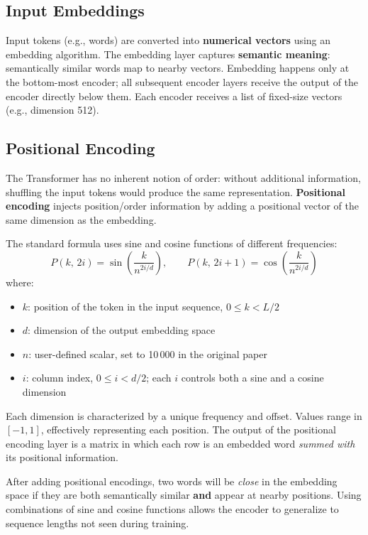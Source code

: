 \documentclass[11pt,a4paper]{article}
\theoremstyle{definition}
\theoremstyle{plain}
\theoremstyle{remark}
\begin{document}
\subsection{Input Embeddings}

Input tokens (e.g., words) are converted into \textbf{numerical vectors} using an embedding algorithm. The embedding layer captures \textbf{semantic meaning}: semantically similar words map to nearby vectors. Embedding happens only at the bottom-most encoder; all subsequent encoder layers receive the output of the encoder directly below them. Each encoder receives a list of fixed-size vectors (e.g., dimension 512).

\subsection{Positional Encoding}

The Transformer has no inherent notion of order: without additional information, shuffling the input tokens would produce the same representation. \textbf{Positional encoding} injects position/order information by adding a positional vector of the same dimension as the embedding.

The standard formula uses sine and cosine functions of different frequencies:
\[
    P(k,\, 2i)   = \sin\!\left(\frac{k}{n^{2i/d}}\right), \qquad
    P(k,\, 2i+1) = \cos\!\left(\frac{k}{n^{2i/d}}\right)
\]
where:
\begin{itemize}
    \item $k$: position of the token in the input sequence, $0 \le k < L/2$
    \item $d$: dimension of the output embedding space
    \item $n$: user-defined scalar, set to 10\,000 in the original paper
    \item $i$: column index, $0 \le i < d/2$; each $i$ controls both a sine and a cosine dimension
\end{itemize}

Each dimension is characterized by a unique frequency and offset. Values range in $[-1, 1]$, effectively representing each position. The output of the positional encoding layer is a matrix in which each row is an embedded word \emph{summed with} its positional information.

\begin{tcolorbox}[colback=yellow!5!white,colframe=yellow!60!black,title=\textbf{Effect of Positional Encoding}]
After adding positional encodings, two words will be \emph{close} in the embedding space if they are both semantically similar \textbf{and} appear at nearby positions. Using combinations of sine and cosine functions allows the encoder to generalize to sequence lengths not seen during training.
\end{tcolorbox}
\end{document}
